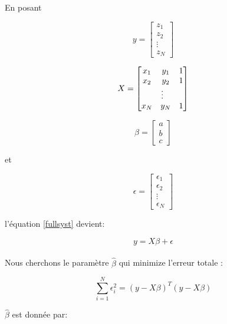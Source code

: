 \documentclass[12pt,a4paper]{report}
\begin{document}
En posant 

\begin{equation}
	y = \begin{bmatrix} z_1 \\ z_2 \\ \vdots \\ z_N \end{bmatrix}
\end{equation}

\begin{equation}
	X = \begin{bmatrix}
	x_1 & y_1 & 1 \\
	x_2 & y_2 & 1 \\ 
	\multicolumn{3}{c}{$\vdots$} \\
	x_N & y_N & 1
	\end{bmatrix}
\end{equation}

\begin{equation}
	\beta = \begin{bmatrix} a \\ b \\ c \end{bmatrix}
\end{equation}

et

\begin{equation} 
\epsilon = \begin{bmatrix} \epsilon_1 \\ \epsilon_2 \\ \vdots \\ \epsilon_N \end{bmatrix}
\end{equation}

l'équation \eqref{fullsyst} devient:

\begin{equation}
\boxed{
	y = X \beta + \epsilon
}
\end{equation}

\paragraph{}Nous cherchons le paramètre $\hat{\beta}$ qui minimize l'erreur totale :

\begin{equation}
	\sum_{i=1}^{N} \epsilon_i^2 = (y - X \beta)^T(y - X \beta)
\end{equation}

$\hat{\beta}$ est donnée par:
\end{document}
